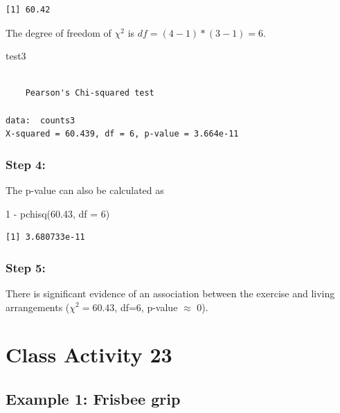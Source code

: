 \documentclass[
]{book}
\newenvironment{Shaded}{\begin{snugshade}}{\end{snugshade}}
\newcommand{\AttributeTok}[1]{\textcolor[rgb]{0.77,0.63,0.00}{#1}}
\newcommand{\DecValTok}[1]{\textcolor[rgb]{0.00,0.00,0.81}{#1}}
\newcommand{\FloatTok}[1]{\textcolor[rgb]{0.00,0.00,0.81}{#1}}
\newcommand{\FunctionTok}[1]{\textcolor[rgb]{0.00,0.00,0.00}{#1}}
\newcommand{\NormalTok}[1]{#1}
\newcommand{\SpecialCharTok}[1]{\textcolor[rgb]{0.00,0.00,0.00}{#1}}
\begin{document}
\begin{verbatim}
[1] 60.42
\end{verbatim}

The degree of freedom of \(\chi^2\) is \(df = (4-1)*(3-1) = 6\).

\begin{Shaded}
\begin{Highlighting}[]
\NormalTok{test3}
\end{Highlighting}
\end{Shaded}

\begin{verbatim}

    Pearson's Chi-squared test

data:  counts3
X-squared = 60.439, df = 6, p-value = 3.664e-11
\end{verbatim}

\hypertarget{step-4}{%
\subsection{Step 4:}\label{step-4}}

The p-value can also be calculated as

\begin{Shaded}
\begin{Highlighting}[]
\DecValTok{1} \SpecialCharTok{{-}} \FunctionTok{pchisq}\NormalTok{(}\FloatTok{60.43}\NormalTok{, }\AttributeTok{df =} \DecValTok{6}\NormalTok{)}
\end{Highlighting}
\end{Shaded}

\begin{verbatim}
[1] 3.680733e-11
\end{verbatim}

\hypertarget{step-5}{%
\subsection{Step 5:}\label{step-5}}

There is significant evidence of an association between the exercise and living arrangements (\(\chi^2 = 60.43\), df=6, p-value \(\approx\) 0).

\hypertarget{class-activity-23}{%
\chapter{Class Activity 23}\label{class-activity-23}}

\hypertarget{example-1-frisbee-grip}{%
\section{Example 1: Frisbee grip}\label{example-1-frisbee-grip}}
\end{document}
